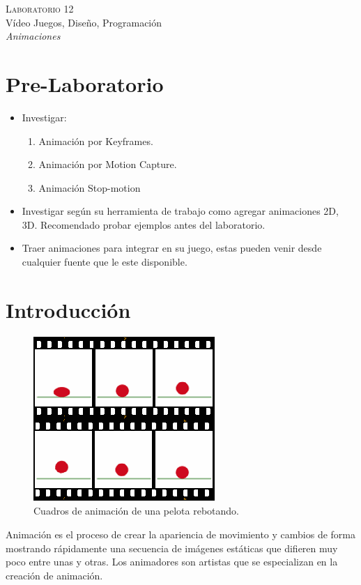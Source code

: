 \begin{center}
\textsc{\Large Laboratorio 12}~\\
{\large Vídeo Juegos, Diseño, Programación}~\\
\emph{Animaciones}
\end{center}

\section{Pre-Laboratorio}
\begin{itemize}
\item Investigar:
\begin{enumerate}
\item Animación por Keyframes.
\item Animación por Motion Capture.
\item Animación Stop-motion
\end{enumerate}
\item Investigar según su herramienta de trabajo como agregar animaciones 2D, 3D. Recomendado probar ejemplos antes del laboratorio.
\item Traer animaciones para integrar en su juego, estas pueden venir desde cualquier fuente que le este disponible.
\end{itemize}

\section{Introducción}
\setlength\intextsep{0pt}
\begin{figure}
\includegraphics[width=\linewidth]{media/anim_frames.png}
\caption{Cuadros de animación de una pelota rebotando.}
\label{fig:particles}
\end{figure}
Animación es el proceso de crear la apariencia de movimiento y cambios de forma mostrando rápidamente una secuencia de imágenes estáticas que difieren muy poco entre unas y otras. Los animadores son artistas que se especializan en la creación de animación.

